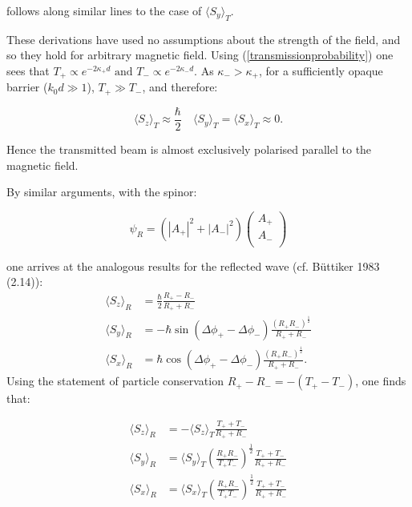 \documentclass{article}
\begin{document}
\noindent follows along similar lines to the case of $\langle S_y \rangle_T$.

\noindent These derivations have used no assumptions about the strength of the field, and so they hold for arbitrary magnetic field. Using (\ref{transmissionprobability}) one sees that $T_+ \propto e^{-2\kappa_+d} \text{ and } T_- \propto e^{-2\kappa_-d}$. As $\kappa_- > \kappa_+$, for a sufficiently opaque barrier ($k_0d \gg 1$), $T_+ \gg T_-$, and therefore:

\begin{equation}
	\langle S_z \rangle_T \approx \frac{\hbar}{2} \quad \langle S_y \rangle_T = \langle S_x \rangle_T \approx 0.
\end{equation}

\noindent Hence the transmitted beam is almost exclusively polarised parallel to the magnetic field.

\noindent By similar arguments, with the spinor:

\begin{equation}
	\psi_R = (|A_{+}|^2+|A_{-}|^2)
	\begin{pmatrix}
		A_{+}\\
		A_{-}\\
	\end{pmatrix}
\end{equation}

\noindent one arrives at the analogous results for the reflected wave (cf. B{\"u}ttiker 1983 (2.14)):
\begin{subequations}
\begin{align}
	\langle S_z \rangle_R &= \frac{\hbar}{2}\frac{R_+-R_-}{R_++R_-}\\
	\langle S_y \rangle_R &= -\hbar \sin{(\Delta\phi_+-\Delta\phi_-)}\frac{(R_+R_-)^{\frac{1}{2}}}{R_++R_-}\\
	\langle S_x \rangle_R &= \hbar \cos{(\Delta\phi_+-\Delta\phi_-)}\frac{(R_+R_-)^{\frac{1}{2}}}{R_++R_-}.
\end{align}
\end{subequations}
\noindent Using the statement of particle conservation $R_+-R_-=-(T_+-T_-)$, one finds that:

\begin{subequations}
\label{stsrrelations}
\begin{align}
	\langle S_z \rangle_R &= -\langle S_z \rangle_T \frac{T_++T_-}{R_++R_-}\\
	\langle S_y \rangle_R &= \langle S_y \rangle_T \left(\frac{R_+R_-}{T_+T_-}\right)^{\frac{1}{2}}\frac{T_++T_-}{R_++R_-} \\
	\langle S_x \rangle_R &= \langle S_x \rangle_T \left(\frac{R_+R_-}{T_+T_-}\right)^{\frac{1}{2}}\frac{T_++T_-}{R_++R_-}
\end{align}
\end{subequations}
\end{document}
